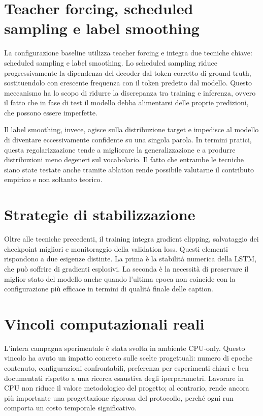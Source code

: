 \documentclass[11pt,a4paper]{report}
\begin{document}
\section{Teacher forcing, scheduled sampling e label smoothing}

La configurazione baseline utilizza teacher forcing e integra due tecniche chiave: scheduled sampling e label smoothing. Lo scheduled sampling riduce progressivamente la dipendenza del decoder dal token corretto di ground truth, sostituendolo con crescente frequenza con il token predetto dal modello. Questo meccanismo ha lo scopo di ridurre la discrepanza tra training e inferenza, ovvero il fatto che in fase di test il modello debba alimentarsi delle proprie predizioni, che possono essere imperfette.

Il label smoothing, invece, agisce sulla distribuzione target e impedisce al modello di diventare eccessivamente confidente su una singola parola. In termini pratici, questa regolarizzazione tende a migliorare la generalizzazione e a produrre distribuzioni meno degeneri sul vocabolario. Il fatto che entrambe le tecniche siano state testate anche tramite ablation rende possibile valutarne il contributo empirico e non soltanto teorico.

\section{Strategie di stabilizzazione}

Oltre alle tecniche precedenti, il training integra gradient clipping, salvataggio dei checkpoint migliori e monitoraggio della validation loss. Questi elementi rispondono a due esigenze distinte. La prima è la stabilità numerica della LSTM, che può soffrire di gradienti esplosivi. La seconda è la necessità di preservare il miglior stato del modello anche quando l'ultima epoca non coincide con la configurazione più efficace in termini di qualità finale delle caption.

\section{Vincoli computazionali reali}

L'intera campagna sperimentale è stata svolta in ambiente CPU-only. Questo vincolo ha avuto un impatto concreto sulle scelte progettuali: numero di epoche contenuto, configurazioni confrontabili, preferenza per esperimenti chiari e ben documentati rispetto a una ricerca esaustiva degli iperparametri. Lavorare in CPU non riduce il valore metodologico del progetto; al contrario, rende ancora più importante una progettazione rigorosa del protocollo, perché ogni run comporta un costo temporale significativo.
\end{document}
